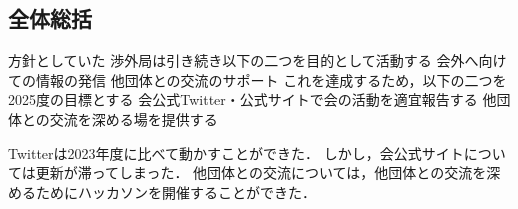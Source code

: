 \subsection*{全体総括}


方針としていた
        渉外局は引き続き以下の二つを目的として活動する
        会外へ向けての情報の発信
        他団体との交流のサポート
    これを達成するため，以下の二つを2025度の目標とする
        会公式Twitter・公式サイトで会の活動を適宜報告する
        他団体との交流を深める場を提供する

Twitterは2023年度に比べて動かすことができた．
しかし，会公式サイトについては更新が滞ってしまった．
他団体との交流については，他団体との交流を深めるためにハッカソンを開催することができた．
